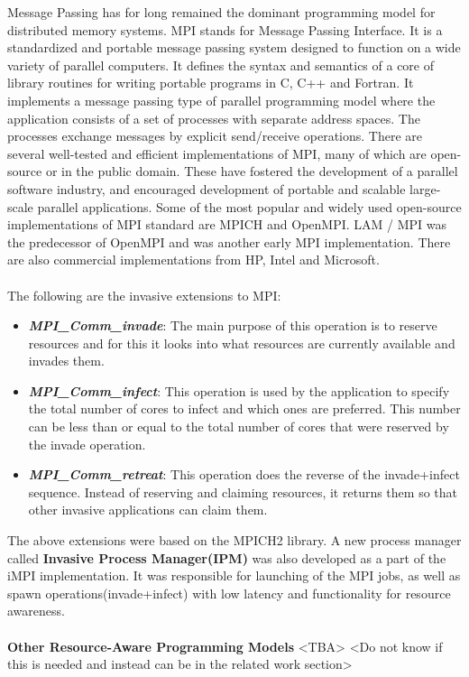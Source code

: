 Message Passing has for long remained the dominant programming model for distributed memory systems. MPI stands for Message Passing Interface. It is a standardized and portable message passing system designed to function on a wide variety of parallel computers. It defines the syntax and semantics of a core of library routines for writing portable programs in C, C++ and Fortran. It implements a message passing type of parallel programming model where the application consists of a set of processes with separate address spaces. The processes exchange messages by explicit send/receive operations. There are several well-tested and efficient implementations of MPI, many of which are open-source or in the public domain. These have fostered the development of a parallel software industry, and encouraged development of portable and scalable large-scale parallel applications. Some of the most popular and widely used open-source implementations of MPI standard are MPICH and OpenMPI. LAM / MPI was the predecessor of OpenMPI and was another early MPI implementation. There are also commercial implementations from HP, Intel and Microsoft.\\  \\
The following are the invasive extensions to MPI:
\begin{itemize}
\item \textbf{\textit{MPI\_Comm\_invade}}: The main purpose of this operation is to reserve resources and for this it looks into what resources are currently available and invades them.
\item \textbf{\textit{MPI\_Comm\_infect}}: This operation is used by the application to specify the total number of cores to infect and which ones are preferred. This number can be less than or equal to the total number of cores that were reserved by the invade operation. 
\item \textbf{\textit{MPI\_Comm\_retreat}}: This operation does the reverse of the invade+infect sequence. Instead of reserving and claiming resources, it returns them so that other invasive applications can claim them.
\end{itemize}
The above extensions were based on the MPICH2 library. A new process manager called \textbf{Invasive Process Manager(IPM)} was also developed as a part of the iMPI implementation. It was responsible for launching of the MPI jobs, as well as spawn operations(invade+infect) with low latency and functionality for resource awareness.\\ \\
\textbf{Other Resource-Aware Programming Models} <TBA> <Do not know if this is needed and instead can be in the related work section>

